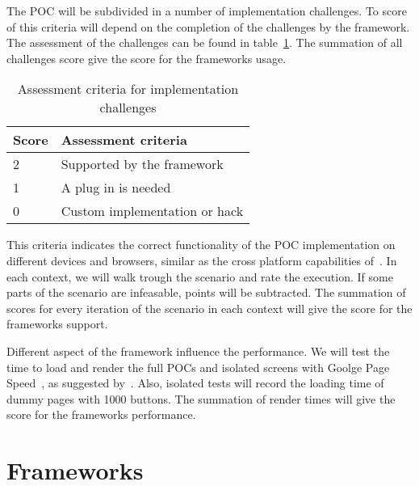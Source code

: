 \documentclass[a4paper]{artikel3}
\renewcommand{\paragraph}[1]{\vspace{2mm} \noindent {\bf #1}  }
\begin{document}
\paragraph{Usage}
The POC will be subdivided in a number of implementation challenges.  
To score of this criteria will depend on the completion of the challenges by the framework.  
The assessment of the challenges can be found in table~\ref{table:challenges-scores}.  
The summation of all challenges score give the score for the frameworks usage.

\begin{table}[h]
\centering
\begin{tabular}{l|l}
\textbf{Score} & \textbf{Assessment criteria}\\
  \hline \hline
2 & Supported by the framework\\
1 & A plug in is needed\\
0 & Custom implementation or hack\\
\end{tabular}
\caption{Assessment criteria for implementation challenges}
\label{table:challenges-scores}
\end{table}

\paragraph{Support}
This criteria indicates the correct functionality of the POC implementation on different devices and browsers,  similar as the cross platform capabilities of~\cite{Sarrafi2012a}.  
In each context,  we will walk trough the scenario and rate the execution.  
If some parts of the scenario are infeasable,  points will be subtracted.  
The summation of scores for every iteration of the scenario in each context will give the score for the frameworks support.

\paragraph{Performance}
Different aspect of the framework influence the performance.  
We will test the time to load and render the full POCs and isolated screens with Goolge Page Speed~\cite{Google2012},  as suggested by~\cite{Morgan2011}.   
Also,  isolated tests will record the loading time of dummy pages with 1000 buttons.  
The summation of render times will give the score for the frameworks performance.

\section{Frameworks} %
\label{sec:frameworks}
\end{document}
